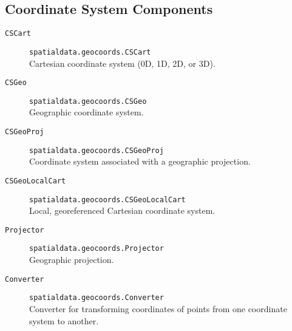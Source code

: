 \subsection{Coordinate System Components}
\begin{description}
\item [{\texttt{CSCart}}] \texttt{spatialdata.geocoords.CSCart}\\
Cartesian coordinate system (0D, 1D, 2D, or 3D).
\item [{\texttt{CSGeo}}] \texttt{spatialdata.geocoords.CSGeo}\\
Geographic coordinate system.
\item [{\texttt{CSGeoProj}}] \texttt{spatialdata.geocoords.CSGeoProj}\\
Coordinate system associated with a geographic projection.
\item [{\texttt{CSGeoLocalCart}}] \texttt{spatialdata.geocoords.CSGeoLocalCart}\\
Local, georeferenced Cartesian coordinate system.
\item [{\texttt{Projector}}] \texttt{spatialdata.geocoords.Projector}\\
Geographic projection.
\item [{\texttt{Converter}}] \texttt{spatialdata.geocoords.Converter}\\
Converter for transforming coordinates of points from one coordinate
system to another.
\end{description}

